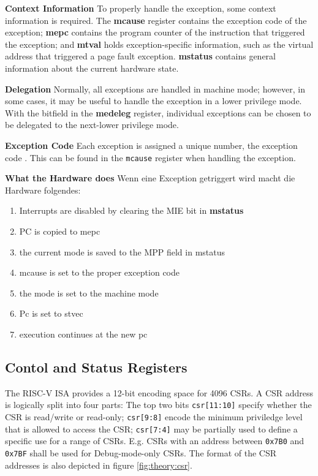 \textbf{Context Information} To properly handle the exception, some context information is required.
The \textbf{mcause} register contains the exception code of the exception; \textbf{mepc} contains
the program counter of the instruction that triggered the exception; and \textbf{mtval} holds
exception-specific information, such as the virtual address that triggered a page fault exception.
\textbf{mstatus} contains general information about the current hardware state.

\textbf{Delegation} Normally, all exceptions are handled in machine mode; however, in some cases,
it may be useful to handle the exception in a lower privilege mode. With the bitfield in the
\textbf{medeleg} register, individual exceptions can be chosen to be delegated to the next-lower
privilege mode.

\textbf{Exception Code} Each exception is assigned a unique number, the exception code \cite{riscvreader}.
This can be found in the \texttt{mcause} register when handling the exception.



\textbf{What the Hardware does} Wenn eine Exception getriggert wird macht die Hardware folgendes:
\begin{enumerate}
    \item Interrupts are disabled by clearing the MIE bit in \textbf{mstatus}
    \item PC is copied to mepc
    \item the current mode is saved to the MPP field in mstatus
    \item mcause is set to the proper exception code
    \item the mode is set to the machine mode
    \item Pc is set to stvec
    \item execution continues at the new pc
\end{enumerate}

\subsection{Contol and Status Registers}
The RISC-V ISA provides a 12-bit encoding space for 4096 CSRs. A CSR address is logically split
into four parts: The top two bits \texttt{csr[11:10]} specify whether the CSR is read/write or read-only;
\texttt{csr[9:8]} encode the minimum priviledge level that is allowed to access the CSR; \texttt{csr[7:4]}
may be partially used to define a specific use for a range of CSRs. E.g. CSRs with an address
between \texttt{0x7B0} and \texttt{0x7BF} shall be used for Debug-mode-only CSRs. The format
of the CSR addresses is also depicted in figure \ref{fig:theory:csr}.

